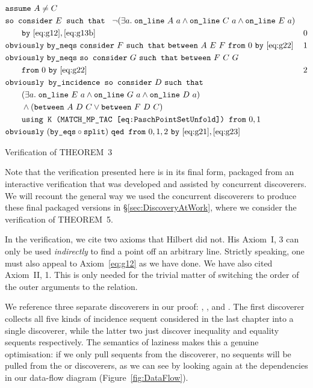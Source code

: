 \begin{boxedfigure}
  \begin{align*}
    &\code{assume}\ A\neq C\\
    &\code{so consider}\ E \code{ such that }\ \Triangle{a}{A}{C}{E}\\
    &\qquad\code{by}\ \eqref{eq:g12},\eqref{eq:g13b}& 0\\
    &\code{obviously}\ \code{by\_neqs}\ \code{consider}\ F\ \code{such that}\ \between{A}{E}{F}\ \code{from}\ 0\ \code{by}\ \eqref{eq:g22} & 1\\
    &\code{obviously}\ \code{by\_neqs}\ \code{so consider}\ G\ \code{such that}\ \between{F}{C}{G}\\&\qquad \code{from}\ 0\ \code{by}\ \eqref{eq:g22} & 2\\
    &\code{obviously by\_incidence so consider}\ D\ \code{such that}\\
    &\qquad(\exists a.\; \code{on\_line}\ E\ a \wedge \code{on\_line}\ G\ a \wedge \code{on\_line}\ D\ a)\\
    &\qquad \wedge (\between{A}{D}{C}\vee\between{F}{D}{C})\\
    &\qquad \code{using K (MATCH\_MP\_TAC \eqref{eq:PaschPointSetUnfold}) from}\ 0,1\\
    &\code{obviously}\ (\code{by\_eqs}\circ\code{split})\ \code{qed from}\ 0,1,2\ \code{by}\ \eqref{eq:g21},\eqref{eq:g23}
  \end{align*}
\caption{Verification of THEOREM~3}
\label{fig:ThreeVerification}
\end{boxedfigure}

Note that the verification presented here is in its final form, packaged from an interactive verification that was developed and assisted by concurrent discoverers. We will recount the general way we used the concurrent discoverers to produce these final packaged versions in \S\ref{sec:DiscoveryAtWork}, where we consider the verification of THEOREM~5.

In the verification, we cite two axioms that Hilbert did not. His Axiom~I, 3 can only be used \emph{indirectly} to find a point off an arbitrary line. Strictly speaking, one must also appeal to Axiom~\ref{eq:g12} as we have done. We have also cited Axiom~II, 1. This is only needed for the trivial matter of switching the order of the outer arguments to the  relation. 

We reference three separate discoverers in our proof: , , and . The first discoverer collects all five kinds of incidence sequent considered in the last chapter into a single discoverer, while the latter two just discover inequality and equality sequents respectively. The semantics of laziness makes this a genuine optimisation: if we only pull sequents from the  discoverer, no sequents will be pulled from the  or  discoverers, as we can see by looking again at the dependencies in our data-flow diagram (Figure~\ref{fig:DataFlow}).

